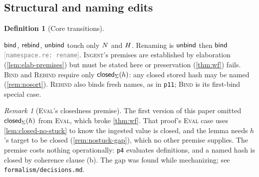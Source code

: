 \documentclass[11pt]{article}
\theoremstyle{definition}
\newtheorem{definition}{Definition}[section]
\theoremstyle{plain}
\theoremstyle{remark}
\newtheorem{remark}{Remark}[section]
\newcommand{\src}[1]{{\footnotesize\textcolor{gray}{[\texttt{#1}]}}}
\begin{document}
\subsection{Structural and naming edits}

\begin{definition}[Core transitions]\label{def:transitions}
$\mathsf{bind}$, $\mathsf{rebind}$, $\mathsf{unbind}$ touch only $N$ and $H$. Renaming is $\mathsf{unbind}$ then
$\mathsf{bind}$ \src{namespace.re: rename}. \textsc{Ingest}'s premises are established by elaboration
(\cref{lem:elab-premises}) but must be stated here or preservation (\cref{thm:wf}) fails.
\textsc{Bind} and \textsc{Rebind} require only $\mathsf{closed}_{\Sigma}(h)$: any closed stored hash
may be named (\cref{rem:nosort}). \textsc{Rebind} also binds fresh names, as in \texttt{p11};
\textsc{Bind} is its first-bind special case.
\end{definition}

\begin{remark}[\textsc{Eval}'s closedness premise]\label{rem:eval-premise}
The first version of this paper omitted $\mathsf{closed}_{\Sigma}(h)$ from \textsc{Eval}, which broke
\cref{thm:wf}. That proof's \textsc{Eval} case uses \cref{lem:closed-no-stuck} to know the
ingested value is closed, and the lemma needs $h$'s target to be closed
(\cref{rem:nostuck-gap}), which no other premise supplies. The premise costs nothing
operationally: \texttt{p4} evaluates definitions, and a named hash is closed by coherence
clause (b). The gap was found while mechanizing; see \texttt{formalism/decisions.md}.
\end{remark}
\end{document}
